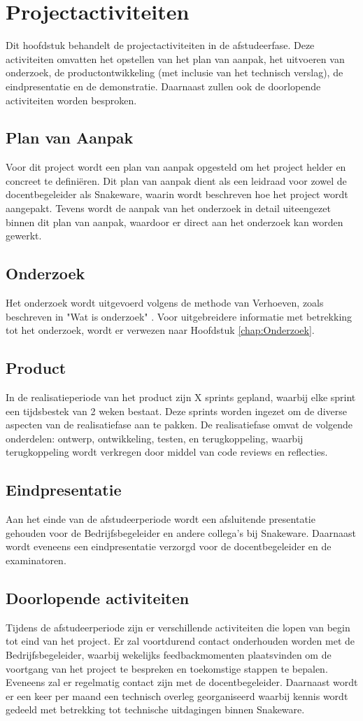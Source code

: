 \chapter{Projectactiviteiten}
Dit hoofdstuk behandelt de projectactiviteiten in de afstudeerfase.
Deze activiteiten omvatten het opstellen van het plan van aanpak, het uitvoeren van onderzoek, de productontwikkeling (met inclusie van het technisch verslag), de eindpresentatie en de demonstratie.
Daarnaast zullen ook de doorlopende activiteiten worden besproken.
\section{Plan van Aanpak}
Voor dit project wordt een plan van aanpak opgesteld om het project helder en concreet te definiëren.
Dit plan van aanpak dient als een leidraad voor zowel de docentbegeleider als Snakeware, waarin wordt beschreven hoe het project wordt aangepakt.
Tevens wordt de aanpak van het onderzoek in detail uiteengezet binnen dit plan van aanpak, waardoor er direct aan het onderzoek kan worden gewerkt.
\section{Onderzoek}
Het onderzoek wordt uitgevoerd volgens de methode van Verhoeven, zoals beschreven in "Wat is onderzoek" \Parencite{Verhoeven}.
Voor uitgebreidere informatie met betrekking tot het onderzoek, wordt er verwezen naar Hoofdstuk \ref{chap:Onderzoek}.
\section{Product}
In de realisatieperiode van het product zijn X sprints gepland, waarbij elke sprint een tijdsbestek van 2 weken bestaat.
Deze sprints worden ingezet om de diverse aspecten van de realisatiefase aan te pakken.
De realisatiefase omvat de volgende onderdelen: ontwerp, ontwikkeling, testen, en terugkoppeling, waarbij terugkoppeling wordt verkregen door middel van code reviews en reflecties.
\section{Eindpresentatie}
Aan het einde van de afstudeerperiode wordt een afsluitende presentatie gehouden voor de Bedrijfsbegeleider en andere collega's bij Snakeware.
Daarnaast wordt eveneens een eindpresentatie verzorgd voor de docentbegeleider en de examinatoren.
\section{Doorlopende activiteiten}
Tijdens de afstudeerperiode zijn er verschillende activiteiten die lopen van begin tot eind van het project.
Er zal voortdurend contact onderhouden worden met de Bedrijfsbegeleider, waarbij wekelijks feedbackmomenten plaatsvinden om de voortgang van het project te bespreken en toekomstige stappen te bepalen.
Eveneens zal er regelmatig contact zijn met de docentbegeleider.
Daarnaast wordt er een keer per maand een technisch overleg georganiseerd waarbij kennis wordt gedeeld met betrekking tot technische uitdagingen binnen Snakeware.
